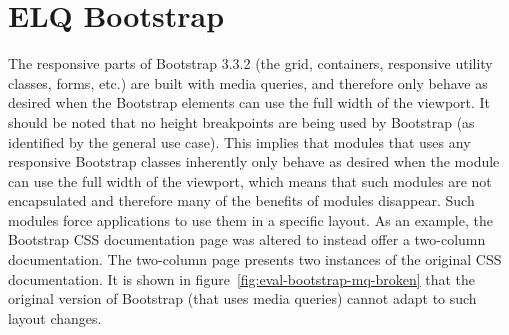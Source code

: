 \documentclass[a4paper,11pt]{kth-mag}
\begin{document}
    \section{ELQ Bootstrap}\label{sec:eval-bootstrap}
      The responsive parts of Bootstrap 3.3.2 (the grid, containers, responsive utility classes, forms, etc.) are built with media queries, and therefore only behave as desired when the Bootstrap elements can use the full width of the viewport.
      It should be noted that no height breakpoints are being used by Bootstrap (as identified by the general use case).
      This implies that modules that uses any responsive Bootstrap classes inherently only behave as desired when the module can use the full width of the viewport, which means that such modules are not encapsulated and therefore many of the benefits of modules disappear.
      Such modules force applications to use them in a specific layout.
      As an example, the Bootstrap \gls{CSS} documentation page was altered to instead offer a two-column documentation.
      The two-column page presents two instances of the original \gls{CSS} documentation.
      It is shown in figure~\ref{fig:eval-bootstrap-mq-broken} that the original version of Bootstrap (that uses media queries) cannot adapt to such layout changes.
\end{document}
